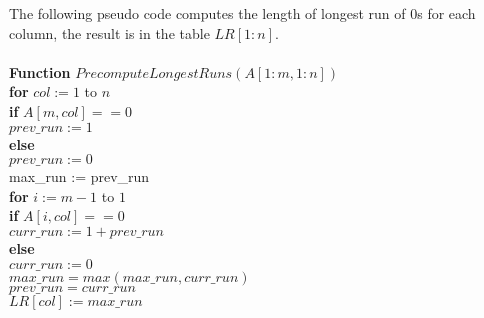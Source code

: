 \documentclass[11pt]{article}
\begin{document}
The following pseudo code computes the length of longest run of 0s for
each column, the result is in the table $LR[1:n]$.\\\\
\textbf{Function} $PrecomputeLongestRuns(A[1:m, 1:n])$\\
\-\hspace{2em} \textbf{for} $col := 1$ to $n$\\
\-\hspace{4em} \textbf{if} $A[m,col] == 0$\\
\-\hspace{6em} $prev\_run := 1$\\
\-\hspace{4em} \textbf{else}\\
\-\hspace{6em} $prev\_run := 0$\\
\-\hspace{4em} max\_run := prev\_run\\
\-\hspace{4em} \textbf{for} $i := m-1$ to $1$\\
\-\hspace{6em} \textbf{if} $A[i,col] == 0$\\
\-\hspace{8em} $curr\_run := 1 + prev\_run$\\
\-\hspace{6em} \textbf{else}\\
\-\hspace{8em} $curr\_run := 0$\\
\-\hspace{6em} $max\_run = max(max\_run, curr\_run)$\\
\-\hspace{6em} $prev\_run = curr\_run$\\
\-\hspace{4em} $LR[col] := max\_run$\\
\end{document}
